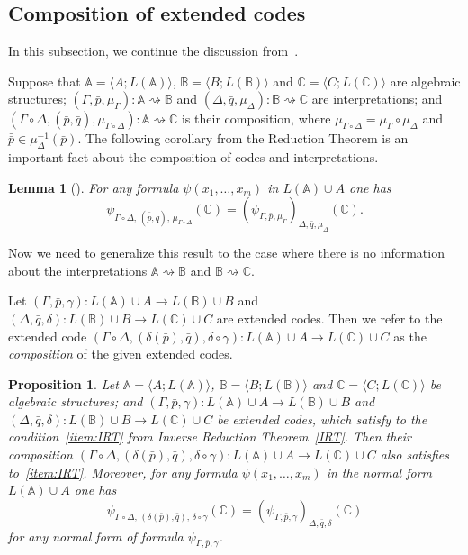 \documentclass[12pt]{article}
\newtheorem{lemma}{Lemma}
\newtheorem{proposition}{Proposition}
\theoremstyle{definition}
\def\MA{{\mathbb{A}}}
\def\MB{{\mathbb{B}}}
\def\MC{{\mathbb{C}}}
\begin{document}
\subsection{Composition of extended codes}\label{subsec:comp_codes}

In this subsection, we continue the discussion from~\cite[Subsection~4.1]{Th_int1}.

Suppose that $\MA=\langle A; L(\MA)\rangle$, $\MB=\langle B; L(\MB)\rangle$ and $\MC=\langle C; L(\MC)\rangle$ are algebraic structures;  
$(\Gamma,\bar p, \mu_\Gamma)\colon \MA\rightsquigarrow\MB$ and $(\Delta,\bar q, \mu_\Delta)\colon \MB\rightsquigarrow\MC$ are interpretations; and $(\Gamma\circ\Delta,(\bar {\bar p},\bar q), \mu_{\Gamma\circ\Delta})\colon \MA\rightsquigarrow\MC$ is their composition, where $\mu_{\Gamma\circ\Delta}=\mu_\Gamma\circ\mu_\Delta$ and $\bar{\bar p}\in \mu_\Delta^{-1}(\bar p)$. The following corollary from the Reduction Theorem is an important fact about the composition of codes and interpretations.

\begin{lemma}[{\cite[Lemma~11]{Th_int1}}]\label{ABC}
For any formula $\psi(x_1,\ldots,x_m)$ in $L(\MA)\cup A$ one has
$$
\psi_{\Gamma\circ\Delta,\,(\bar{\bar p},\bar q),\,\mu_{\Gamma\circ\Delta}}(\MC)= (\psi_{\Gamma,\bar p, \mu_\Gamma})_{\Delta,\bar q, \mu_\Delta}(\MC).
$$
\end{lemma}

Now we need to generalize this result to the case where there is no information about the interpretations $\MA\rightsquigarrow\MB$ and $\MB\rightsquigarrow\MC$.

Let $(\Gamma,\bar p, \gamma)\colon L(\MA)\cup A\to L(\MB)\cup B$ and $(\Delta,\bar q, \delta)\colon L(\MB)\cup B \to L(\MC)\cup C$ are extended codes. Then we refer to the extended code $(\Gamma\circ\Delta,(\delta(\bar p),\bar q), \delta\circ\gamma)\colon L(\MA)\cup A\to L(\MC)\cup C$ as the {\em composition} of the given extended codes. 

\begin{proposition}\label{ABC_ext}
Let $\MA=\langle A;L(\MA)\rangle$, $\MB=\langle B;L(\MB)\rangle$ and $\MC=\langle C;L(\MC)\rangle$ be algebraic structures; and $(\Gamma,\bar p, \gamma)\colon L(\MA)\cup A\to L(\MB)\cup B$ and $(\Delta,\bar q, \delta)\colon L(\MB)\cup B \to L(\MC)\cup C$ be extended codes, which satisfy to the condition~\ref{item:IRT} from Inverse Reduction Theorem~\ref{IRT}. Then their composition $(\Gamma\circ\Delta,(\delta(\bar p),\bar q), \delta\circ\gamma)\colon L(\MA)\cup A\to L(\MC)\cup C$ also satisfies to~\ref{item:IRT}. Moreover, for any formula $\psi(x_1,\ldots,x_m)$ in the normal form $L(\MA)\cup A$ one has
\begin{equation}\label{eq:ABC}
  \psi_{\Gamma\circ\Delta,\,(\delta({\bar p}),\bar q),\,\delta\circ\gamma}(\MC)= (\psi_{\Gamma,\bar p, \gamma})_{\Delta,\bar q, \delta}(\MC)  
\end{equation}
for any normal form of formula $\psi_{\Gamma,\bar p, \gamma}$.
\end{proposition}
\end{document}
